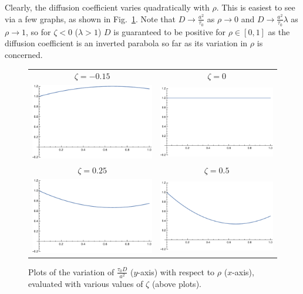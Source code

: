 Clearly, the diffusion coefficient varies quadratically with $\rho$. This is easiest to see via a few graphs, as shown in Fig.~\ref{fig:analDiffCoeffs}. Note that $D \rightarrow \frac{a^2}{\tau_0}$ as $\rho \rightarrow 0$
and $D \rightarrow \frac{a^2}{\tau_0} \lambda$ as $\rho \rightarrow 1$, so for $\zeta < 0$ ($\lambda>1$) $D$ is guaranteed to be positive for $\rho \in [0, 1]$ as the diffusion coefficient is an inverted parabola so far as its
variation in $\rho$ is concerned.
\begin{figure}[h!]
\caption[Some plots of the variation of the MFT diffusion coefficient with density, for some selected $\lambda$.]{\label{fig:analDiffCoeffs} Plots of the variation of $\frac{\tau_0 D}{a^2}$ ($y$-axis) with respect to $\rho$ ($x$-axis), evaluated with various values of $\zeta$ (above plots).}
\begin{center}
 \begin{tabular}{c c}
     $\zeta = -0.15$ & $\zeta = 0$ \\ 
     \includegraphics[width=0.49\linewidth]{analytics/images/diffCoeffs/diffCoeff-neg0-15}  & \includegraphics[width=0.49 \linewidth]{analytics/images/diffCoeffs/diffCoeff-0-0} \\
     $\zeta = 0.25$  & $\zeta = 0.5$ \\
     \includegraphics[width=0.49\linewidth]{analytics/images/diffCoeffs/diffCoeff-0-25}  & \includegraphics[width=0.49 \linewidth]{analytics/images/diffCoeffs/diffCoeff-0-5} \\

\end{tabular}
\end{center}
\end{figure}
